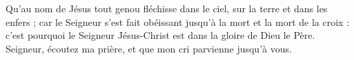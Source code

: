 Qu’au nom de Jésus tout genou fléchisse dans le ciel, sur la terre et dans les enfers ; car le Seigneur s’est fait obéissant jusqu’à la mort et la mort de la croix : c’est pourquoi le Seigneur Jésus-Christ est dans la gloire de Dieu le Père.
\versseparator
Seigneur, écoutez ma prière, et que mon cri parvienne jusqu’à vous.
